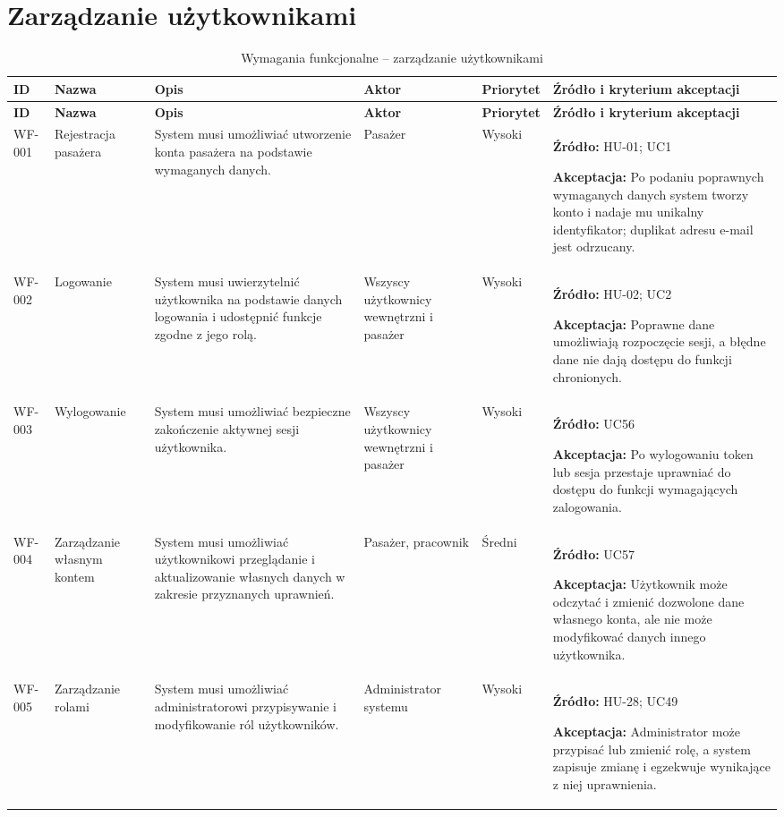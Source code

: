 \documentclass[12pt,a4paper,oneside]{report}
\begin{document}
\section{Zarządzanie użytkownikami}
\small
\begin{longtable}{|p{1.05cm}|p{2.15cm}|p{3.35cm}|p{1.75cm}|p{0.95cm}|p{4.05cm}|}
\caption{Wymagania funkcjonalne -- zarządzanie użytkownikami}\\\hline
\rowcolor{lightblue}\textbf{ID} & \textbf{Nazwa} & \textbf{Opis} & \textbf{Aktor} & \textbf{Priorytet} & \textbf{Źródło i kryterium akceptacji}\\\hline
\endfirsthead
\hline
\rowcolor{lightblue}\textbf{ID} & \textbf{Nazwa} & \textbf{Opis} & \textbf{Aktor} & \textbf{Priorytet} & \textbf{Źródło i kryterium akceptacji}\\\hline
\endhead
WF-001 & Rejestracja pasażera & System musi umożliwiać utworzenie konta pasażera na podstawie wymaganych danych. & Pasażer & Wysoki & \textbf{Źródło:} HU-01; UC1\par\textbf{Akceptacja:} Po podaniu poprawnych wymaganych danych system tworzy konto i nadaje mu unikalny identyfikator; duplikat adresu e-mail jest odrzucany.\\\hline
WF-002 & Logowanie & System musi uwierzytelnić użytkownika na podstawie danych logowania i udostępnić funkcje zgodne z jego rolą. & Wszyscy użytkownicy wewnętrzni i pasażer & Wysoki & \textbf{Źródło:} HU-02; UC2\par\textbf{Akceptacja:} Poprawne dane umożliwiają rozpoczęcie sesji, a błędne dane nie dają dostępu do funkcji chronionych.\\\hline
WF-003 & Wylogowanie & System musi umożliwiać bezpieczne zakończenie aktywnej sesji użytkownika. & Wszyscy użytkownicy wewnętrzni i pasażer & Wysoki & \textbf{Źródło:} UC56\par\textbf{Akceptacja:} Po wylogowaniu token lub sesja przestaje uprawniać do dostępu do funkcji wymagających zalogowania.\\\hline
WF-004 & Zarządzanie własnym kontem & System musi umożliwiać użytkownikowi przeglądanie i aktualizowanie własnych danych w zakresie przyznanych uprawnień. & Pasażer, pracownik & Średni & \textbf{Źródło:} UC57\par\textbf{Akceptacja:} Użytkownik może odczytać i zmienić dozwolone dane własnego konta, ale nie może modyfikować danych innego użytkownika.\\\hline
WF-005 & Zarządzanie rolami & System musi umożliwiać administratorowi przypisywanie i modyfikowanie ról użytkowników. & Administrator systemu & Wysoki & \textbf{Źródło:} HU-28; UC49\par\textbf{Akceptacja:} Administrator może przypisać lub zmienić rolę, a system zapisuje zmianę i egzekwuje wynikające z niej uprawnienia.\\\hline

\end{longtable}
\end{document}
